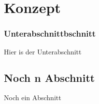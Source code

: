 \chapter{Konzept}

\subsection{Unterabschnittbschnitt}
Hier is der Unterabschnitt

\section{Noch n Abschnitt}
Noch ein Abschnitt